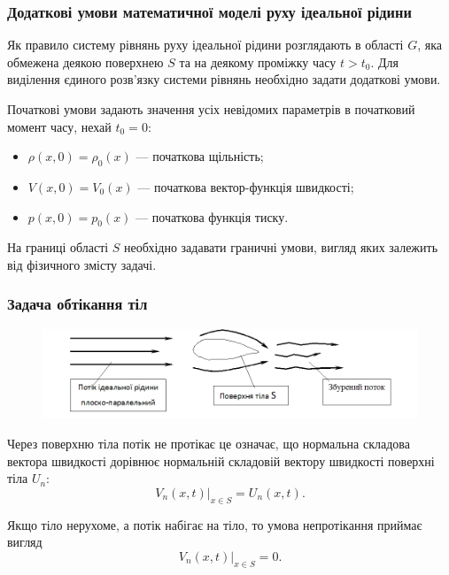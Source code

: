 \subsubsection{Додаткові умови математичної моделі руху ідеальної рідини}

Як правило систему рівнянь руху ідеальної рідини розглядають в області $G$, яка обмежена деякою поверхнею $S$ та на деякому проміжку часу $t > t_0$. Для виділення єдиного розв'язку системи рівнянь необхідно задати додаткові умови. \medskip

Початкові умови задають значення усіх невідомих параметрів в початковий момент часу, нехай $t_ 0 = 0$:
\begin{itemize}
	\item $\rho(x, 0) = \rho_0(x)$ --- початкова щільність;
	\item $V(x, 0) = V_0(x)$ --- початкова вектор-функція швидкості;
	\item $p(x, 0) = p_0(x)$ --- початкова функція тиску.
\end{itemize}

На границі області $S$ необхідно задавати граничні умови, вигляд яких залежить від фізичного змісту задачі. 

\subsubsection{Задача обтікання тіл}

\begin{figure}[H]
	\centering
	\includegraphics[width=\textwidth]{img/10-1.png}
\end{figure}

Через поверхню тіла потік не протікає це означає, що нормальна складова вектора швидкості дорівнює нормальній складовій вектору швидкості поверхні тіла $U_n$:
\begin{equation}
	\left. V_n(x, t) \right|_{x \in S} = U_n(x, t).
\end{equation}

Якщо тіло нерухоме, а потік набігає на тіло, то умова непротікання приймає вигляд
\begin{equation}
	\left. V_n(x, t) \right|_{x \in S} = 0.
\end{equation}

